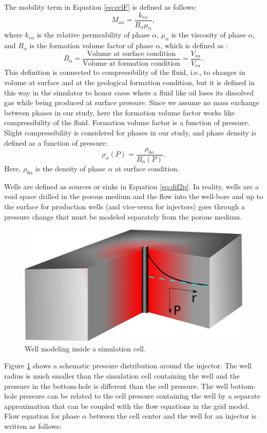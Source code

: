The mobility term in Equation \ref{eq:eclF} is defined as follows:
\begin{equation}
 M_{a\alpha}=\frac{k_{r\alpha}}{B_\alpha \mu_\alpha},
 \label{eq:mob}
\end{equation} where $k_{r\alpha}$ is the relative permeability of phase
$\alpha$, $\mu_\alpha$ is the viscosity of phase $\alpha$, and $B_\alpha$ is the
formation volume factor of phase $\alpha$, which is defined as :
\begin{equation}
 B_\alpha=\frac{\mbox{Volume at surface condition}}{\mbox{Volume at formation
condition}}=\frac{V_{s\alpha}}{V_{r\alpha}}.  
\end{equation} This definition is connected to compressibility
of the fluid, i.e., to changes in volume at surface and at the geological formation condition, but it is defined in this way in the simulator to honor cases where a
fluid like oil loses its dissolved gas while being produced at surface pressure.
Since we assume no mass exchange between phases in our study, here the formation
volume factor works like compressibility of the fluid. Formation volume factor
is a function of pressure. Slight compressibility is considered for phases in our study, and phase density
is defined as a function of pressure:
\begin{equation}
 \rho_\alpha(P) =\frac{\rho_{0\alpha}}{B_\alpha(P)}.
 \label{eq:rho}
\end{equation} Here, $\rho_{0\alpha}$ is the density of phase $\alpha$ at
surface condition.

Wells are defined as sources or sinks in Equation \ref{eq:dif2p}. In reality, wells
are a void space drilled in the porous medium and the flow into the
well-bore and up to the surface for production wells (and vice-versa for injectors)
goes through a pressure change that must be modeled separately from the porous
medium. 


\begin{figure}
 \centering{}
 \includegraphics[width=0.4\linewidth]{./figurer/WModel}
 \caption{Well modeling inside a simulation cell.}
 \label{fig:WM}
\end{figure}

Figure \ref{fig:WM} shows a schematic pressure distribution around the
injector. The well radius is much smaller than the simulation cell containing
the well and the pressure in the bottom-hole is different than the cell
pressure. The well bottom-hole pressure can be related to the cell pressure
containing the well by a separate approximation that can be coupled with the
flow equations in the grid model. Flow equation for phase $\alpha$ between the
cell center and the well for an injector is written as follows:

